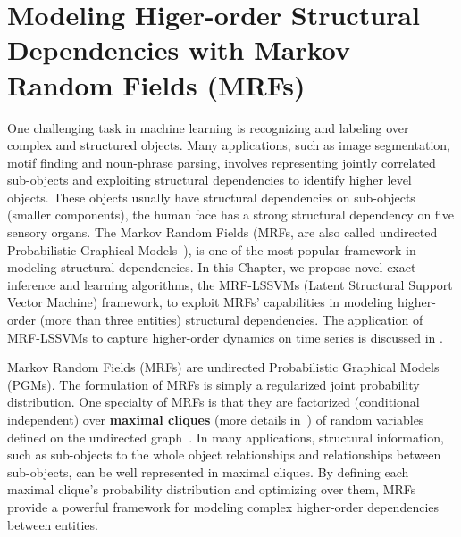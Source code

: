 
\chapter[MRF-LSSVMs]{Modeling Higer-order Structural Dependencies with Markov Random Fields (MRFs)}
\label{cha:mrf}

One challenging task in machine learning is recognizing and
labeling over complex and structured objects. Many applications,
such as image segmentation, motif finding and noun-phrase
parsing, involves representing jointly correlated sub-objects and
exploiting structural dependencies to identify higher level
objects. These objects usually have structural dependencies on
sub-objects (smaller components), \eg the human face has a strong
structural dependency on five sensory organs. The Markov Random
Fields (MRFs, are also called undirected Probabilistic Graphical
Models~\cite{bishop:2006:PRML}), is one of the most popular
framework in modeling structural dependencies. In this Chapter,
we propose novel exact inference and learning algorithms, the
MRF-LSSVMs (Latent Structural Support Vector Machine) framework,
to exploit MRFs' capabilities in modeling higher-order (more than
three entities) structural dependencies. The application of
MRF-LSSVMs to capture higher-order dynamics on time series is
discussed in .

Markov Random Fields (MRFs) are undirected Probabilistic
Graphical Models (PGMs). The formulation of MRFs is simply a
regularized joint probability distribution. One specialty of MRFs
is that they are factorized (conditional independent) over
\textbf{maximal cliques} (more details in~) of
random variables defined on the undirected
graph~\cite{bishop:2006:PRML}. In many applications, structural
information, such as sub-objects to the whole object
relationships and relationships between sub-objects, can be well
represented in maximal cliques. By defining each maximal clique's
probability distribution and optimizing over them, MRFs provide a
powerful framework for modeling complex higher-order
dependencies between entities.

